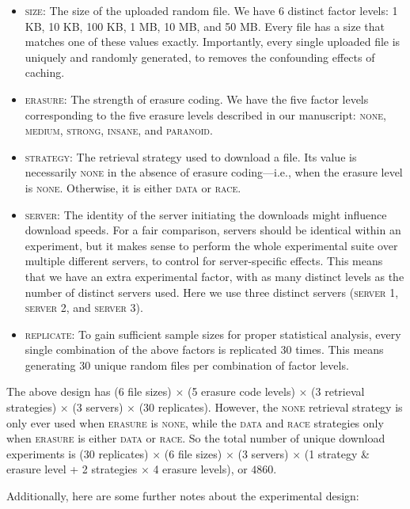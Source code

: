 \documentclass[11pt]{article}
\begin{document}
\begin{itemize}
\item \textsc{size}: The size of the uploaded random file. We have 6 distinct factor levels: 1 KB, 10 KB, 100 KB, 1 MB, 10 MB, and 50 MB. Every file has a size that matches one of these values exactly. Importantly, every single uploaded file is uniquely and randomly generated, to removes the confounding effects of caching.
\item \textsc{erasure}: The strength of erasure coding. We have the five factor levels corresponding to the five erasure levels described in our manuscript: \textsc{none}, \textsc{medium}, \textsc{strong}, \textsc{insane}, and \textsc{paranoid}.
\item \textsc{strategy}: The retrieval strategy used to download a file. Its value is necessarily \textsc{none} in the absence of erasure coding---i.e., when the erasure level is \textsc{none}. Otherwise, it is either \textsc{data} or \textsc{race}.
\item \textsc{server}: The identity of the server initiating the downloads might influence download speeds. For a fair comparison, servers should be identical within an experiment, but it makes sense to perform the whole experimental suite over multiple different servers, to control for server-specific effects. This means that we have an extra experimental factor, with as many distinct levels as the number of distinct servers used. Here we use three distinct servers (\textsc{server 1}, \textsc{server 2}, and \textsc{server 3}).
\item \textsc{replicate}: To gain sufficient sample sizes for proper statistical analysis, every single combination of the above factors is replicated 30 times. This means generating 30 unique random files per combination of factor levels.
\end{itemize}

The above design has (6 file sizes) $\times$ (5 erasure code levels) $\times$ (3 retrieval strategies) $\times$ (3 servers) $\times$ (30 replicates). However, the \textsc{none} retrieval strategy is only ever used when \textsc{erasure} is \textsc{none}, while the \textsc{data} and \textsc{race} strategies only when \textsc{erasure} is either \textsc{data} or \textsc{race}. So the total number of unique download experiments is (30 replicates) $\times$ (6 file sizes) $\times$ (3 servers) $\times$ (1 strategy \& erasure level + 2 strategies $\times$ 4 erasure levels), or $4860$.

Additionally, here are some further notes about the experimental design:
\end{document}
